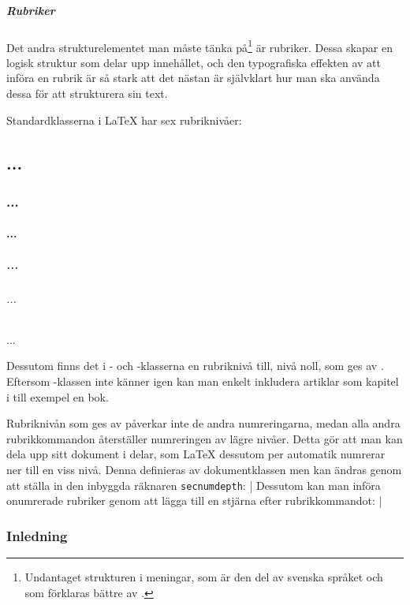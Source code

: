 \documentclass[lang=sv,ptsize=10pt,font=none,nomath,titles=bf,../../a4.tex]{subfiles}
\begin{document}
\subsubsection{Rubriker}
Det andra strukturelementet man måste tänka på\footnote{Undantaget
strukturen i meningar, som är den del av svenska språket och som förklaras
bättre av \textcite{LIU98}.} är rubriker. Dessa skapar en logisk
struktur som delar upp innehållet, och den typografiska effekten av att
införa en rubrik är så stark att det nästan är självklart hur man ska
använda dessa för att strukturera sin text.

Standardklasserna i \LaTeX{} har sex rubriknivåer:
\begin{latexcode}
\part{...}          %
\section{...}       %
\subsection{...}    %
\subsubsection{...} %
\paragraph{...}     %
\subparagraph{...}  %
\end{latexcode}

Dessutom finns det i - och -klasserna en
rubriknivå till, nivå noll, som ges av . 
Eftersom -klassen inte känner igen  kan man
enkelt inkludera artiklar som kapitel i till exempel en bok.

Rubriknivån som ges av  påverkar inte de andra numreringarna,
medan alla andra rubrikkommandon återställer numreringen av lägre nivåer.
Detta gör att man kan dela upp sitt dokument i delar, som
\LaTeX{} dessutom per automatik numrerar ner till en viss nivå. Denna
definieras av dokumentklassen men kan ändras genom att ställa in
den inbyggda räknaren \texttt{secnumdepth}:
\latex|\setcounter{secnumdepth}{2} %
Dessutom kan man införa onumrerade rubriker genom att lägga till en
stjärna efter rubrikkommandot:
\latex|\section*{Inledning} %
\end{document}
